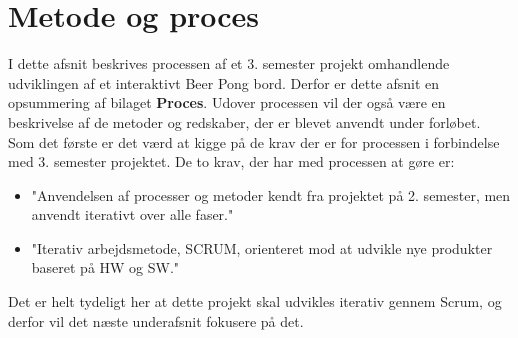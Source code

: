 \documentclass[Rapport/Rapport_main.tex]{subfiles}
\begin{document}
\section{Metode og proces}
I dette afsnit beskrives processen af et 3. semester projekt omhandlende udviklingen af et interaktivt Beer Pong bord. Derfor er dette afsnit en opsummering af bilaget \textbf{Proces}. Udover processen vil der også være en beskrivelse af de metoder og redskaber, der er blevet anvendt under forløbet. \\
Som det første er det værd at kigge på de krav der er for processen i forbindelse med 3. semester projektet\cite{Universitet2018}. De to krav, der har med processen at gøre er:
\begin{itemize}
    \item "Anvendelsen af processer og metoder kendt fra projektet på 2. semester, men anvendt iterativt over alle faser."
    \item "Iterativ arbejdsmetode, SCRUM, orienteret mod at udvikle nye produkter baseret på HW og SW."
\end{itemize}
Det er helt tydeligt her at dette projekt skal udvikles iterativ gennem Scrum, og derfor vil det næste underafsnit fokusere på det.
\end{document}

